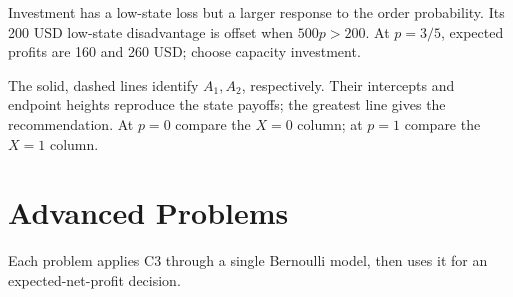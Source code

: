 Investment has a low-state loss but a larger response to the order probability. Its 200 USD low-state disadvantage is offset when $500p>200$. At $p=3/5$, expected profits are 160 and 260 USD; choose capacity investment.
\begin{center}\end{center}
The solid, dashed lines identify $A_1,A_2$, respectively. Their intercepts and endpoint heights reproduce the state payoffs; the greatest line gives the recommendation. At $p=0$ compare the $X=0$ column; at $p=1$ compare the $X=1$ column.
\clearpage
\section{Advanced Problems}\label{sec:t2-c3-advanced}
Each problem applies C3 through a single Bernoulli model, then uses it for an expected-net-profit decision.
